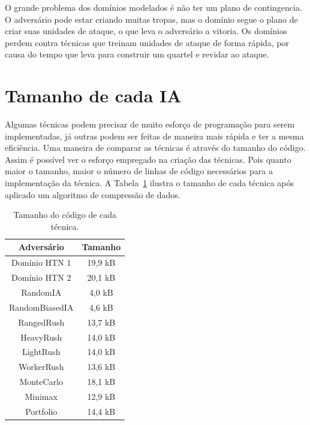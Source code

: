 O grande problema dos domínios modelados é não ter um plano de contingencia.
O adversário pode estar criando muitas tropas, mas o domínio segue o plano de criar suas unidades de ataque, o que leva o adversário a vitoria.
Os domínios perdem contra técnicas que treinam unidades de ataque de forma rápida, por causa do tempo que leva para construir um quartel e revidar ao ataque.

 

\section{Tamanho de cada IA}

Algumas técnicas podem precisar de muito esforço de programação para serem implementadas, já outras podem ser feitas de maneira mais rápida e ter a mesma eficiência.
Uma maneira de comparar as técnicas é através do tamanho do código.
Assim é possível ver o esforço empregado na criação das técnicas.
Pois quanto maior o tamanho, maior o número de linhas de código necessários para a implementação da técnica.
A Tabela~\ref{tab:tamanho} ilustra o tamanho de cada técnica após aplicado um algoritmo de compressão de dados.

\begin{table}[ht]
	\centering
	\caption{Tamanho do código de cada técnica.}
	\label{tab:tamanho}
	\begin{tabular}{|c|c|}
		\hline
		\textbf{Adversário}     & \textbf{Tamanho} \\ \hline
		Domínio HTN 1           & 19,9 kB          \\ \hline
		Domínio HTN 2           & 20,1 kB          \\ \hline
		RandomIA                & 4,0 kB           \\ \hline
		RandomBiasedIA          & 4,6 kB           \\ \hline
		RangedRush              & 13,7 kB          \\ \hline
		HeavyRush               & 14,0 kB          \\ \hline
		LightRush               & 14,0 kB          \\ \hline
		WorkerRush              & 13,6 kB          \\ \hline
		MonteCarlo              & 18,1 kB          \\ \hline
		Minimax                 & 12,9 kB          \\ \hline
		Portfolio               & 14,4 kB          \\ \hline
	\end{tabular}
\end{table}

